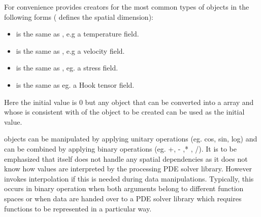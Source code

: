 For convenience \escript provides creators for the most common types
of \Data objects in the following forms ( defines the 
spatial dimension):
\begin{itemize}
\item {} is the same as , 
e.g a temperature field. 
\item {}is the same as , e.g
a velocity field.   
\item {} is the same as ,
eg. a stress field.  
\item {} is the same as 
eg. a Hook tensor field.   
\end{itemize}
Here the initial value is $0$ but any object that can be converted into a \numarray array and whose \Shape
is consistent with \Shape of the \Data object to be created can be used as the initial value.

\Data objects can be manipulated by applying unitary operations (eg. cos, sin, log) 
and can be combined by applying binary operations (eg. +, - ,* , /). 
It is to be emphasized that \escript itself does not handle any spatial dependencies as 
it does not know how values are interpreted by the processing PDE solver library. 
However \escript invokes interpolation if this is needed during data manipulations. 
Typically, this occurs in binary operation when both arguments belong to different
function spaces or when data are handed over to a PDE solver library 
which requires functions to be represented in a particular way. 

